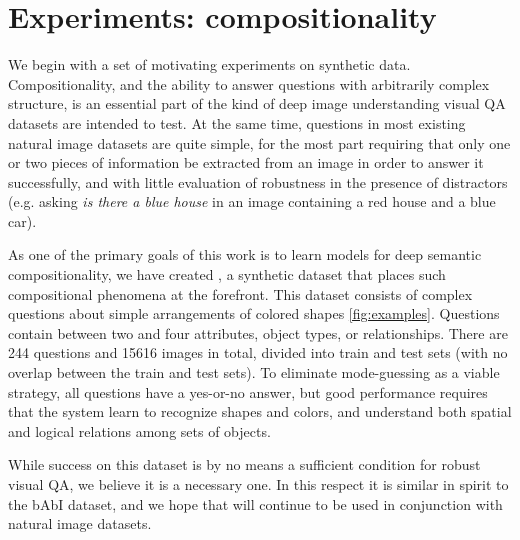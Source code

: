 \section{Experiments: compositionality}

We begin with a set of motivating experiments on synthetic data.
Compositionality, and the ability to answer questions with arbitrarily complex
structure, is an essential part of the kind of deep image understanding visual
QA datasets are intended to test. At the same time, questions in most existing
natural image datasets are quite simple, for the most part requiring that only
one or two pieces of information be extracted from an image in order to answer
it successfully, and with little evaluation of robustness in the presence of
distractors (e.g. asking \emph{is there a blue house} in an image containing a
red house and a blue car).

As one of the primary goals of this work is to learn models for deep semantic
compositionality, we have created \shapes, a synthetic dataset that places such
compositional phenomena at the forefront. This dataset consists of complex
questions about simple arrangements of colored shapes \autoref{fig:examples}.  Questions contain
between two and four attributes, object types, or relationships.  There are 244
questions and 15616 images in total, divided into train and test sets (with no
overlap between the train and test sets). To eliminate mode-guessing as a
viable strategy, all questions have a yes-or-no answer, but good performance
requires that the system learn to recognize shapes and colors, and understand
both spatial and logical relations among sets of objects.

While success on this dataset is by no means a sufficient condition for robust
visual QA, we believe it is a necessary one. In this respect it is similar in
spirit to the bAbI \cite{Weston15BABI} dataset, and we hope that \shapes will
continue to be used in conjunction with natural image datasets.



